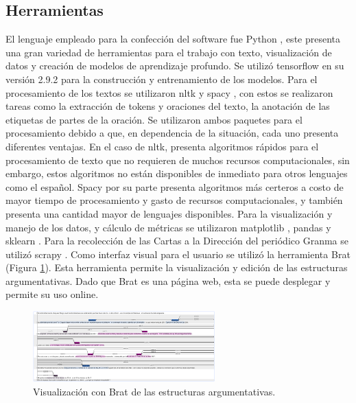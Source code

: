 \documentclass[a4paper,11pt,twocolumn,twoside]{article}
\begin{document}
\subsection{Herramientas}

El lenguaje empleado para la confección del software fue Python \cite{python}, este presenta 
una gran variedad de herramientas 
para el trabajo con texto, visualización de datos y creación de modelos de aprendizaje profundo.
Se utilizó tensorflow \cite{tensorflow} en su versión 2.9.2 para la construcción y entrenamiento de los modelos. 
Para el procesamiento de los textos se utilizaron nltk \cite{nltk} y spacy \cite{spacy}, con estos se realizaron tareas
como la extracción de tokens y oraciones del texto, la anotación de las etiquetas de partes de la oración. Se utilizaron 
ambos paquetes para el procesamiento debido a que, en dependencia de la situación, cada uno presenta diferentes
ventajas. En el caso de nltk, presenta algoritmos rápidos para el procesamiento de texto que no 
requieren de muchos recursos computacionales, sin embargo, estos algoritmos no están disponibles de inmediato
para otros lenguajes como el español. Spacy por su parte presenta algoritmos más certeros a costo 
de mayor tiempo de procesamiento y gasto de recursos computacionales, y también presenta una cantidad mayor de lenguajes 
disponibles. Para la visualización y manejo de los datos, y cálculo de métricas se utilizaron 
matplotlib \cite{matplotlib}, pandas \cite{pandas} y sklearn \cite{sklearn}. 
Para la recolección de las Cartas a la Dirección del periódico Granma se utilizó scrapy \cite{scrapy}.
Como interfaz visual para el usuario se utilizó la herramienta Brat \cite{brat}
(Figura \ref{fig:brat_persuasive_granma_letters}). Esta herramienta permite
la visualización y edición de las estructuras argumentativas. Dado que Brat es una página web, esta se puede
desplegar y permite su uso online.

\begin{figure}[h]
	\centering
	\includegraphics[width=7cm]{Graphics/persuasive_2019-03-22_inconformidad-con-la-chequera.png}
	\caption{Visualización con Brat de las estructuras argumentativas.}
	\label{fig:brat_persuasive_granma_letters}
\end{figure}
\end{document}
